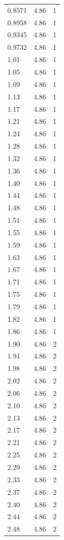 \begin{longtable}{lrr}
  0.8571 & 4.86 & 1 \\
  0.8958 & 4.86 & 1 \\
  0.9345 & 4.86 & 1 \\
  0.9732 & 4.86 & 1 \\
  1.01 & 4.86 & 1 \\
  1.05 & 4.86 & 1 \\
  1.09 & 4.86 & 1 \\
  1.13 & 4.86 & 1 \\
  1.17 & 4.86 & 1 \\
  1.21 & 4.86 & 1 \\
  1.24 & 4.86 & 1 \\
  1.28 & 4.86 & 1 \\
  1.32 & 4.86 & 1 \\
  1.36 & 4.86 & 1 \\
  1.40 & 4.86 & 1 \\
  1.44 & 4.86 & 1 \\
  1.48 & 4.86 & 1 \\
  1.51 & 4.86 & 1 \\
  1.55 & 4.86 & 1 \\
  1.59 & 4.86 & 1 \\
  1.63 & 4.86 & 1 \\
  1.67 & 4.86 & 1 \\
  1.71 & 4.86 & 1 \\
  1.75 & 4.86 & 1 \\
  1.79 & 4.86 & 1 \\
  1.82 & 4.86 & 1 \\
  1.86 & 4.86 & 1 \\
  1.90 & 4.86 & 2 \\
  1.94 & 4.86 & 2 \\
  1.98 & 4.86 & 2 \\
  2.02 & 4.86 & 2 \\
  2.06 & 4.86 & 2 \\
  2.10 & 4.86 & 2 \\
  2.13 & 4.86 & 2 \\
  2.17 & 4.86 & 2 \\
  2.21 & 4.86 & 2 \\
  2.25 & 4.86 & 2 \\
  2.29 & 4.86 & 2 \\
  2.33 & 4.86 & 2 \\
  2.37 & 4.86 & 2 \\
  2.40 & 4.86 & 2 \\
  2.44 & 4.86 & 2 \\
  2.48 & 4.86 & 2 \\

\end{longtable}
